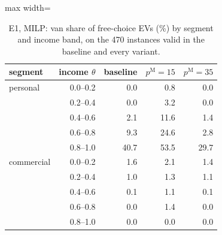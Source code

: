 \begin{table}[H]\centering
\small
\caption{E1, MILP: van share of free-choice EVs (\%) by segment and income band, on the 470 instances valid in the baseline and every variant.}\label{tab:bandE1}
\begin{adjustbox}{max width=\textwidth}\begin{tabular}{lrrrr}\toprule
segment & income $\theta$ & baseline & $p^{\mathrm M}=15$ & $p^{\mathrm M}=35$ \\ \midrule
personal & 0.0--0.2 & 0.0 & 0.8 & 0.0 \\
 & 0.2--0.4 & 0.0 & 3.2 & 0.0 \\
 & 0.4--0.6 & 2.1 & 11.6 & 1.4 \\
 & 0.6--0.8 & 9.3 & 24.6 & 2.8 \\
 & 0.8--1.0 & 40.7 & 53.5 & 29.7 \\
commercial & 0.0--0.2 & 1.6 & 2.1 & 1.4 \\
 & 0.2--0.4 & 1.0 & 1.3 & 1.1 \\
 & 0.4--0.6 & 0.1 & 1.1 & 0.1 \\
 & 0.6--0.8 & 0.0 & 1.4 & 0.0 \\
 & 0.8--1.0 & 0.0 & 0.0 & 0.0 \\
\bottomrule\end{tabular}\end{adjustbox}\end{table}
